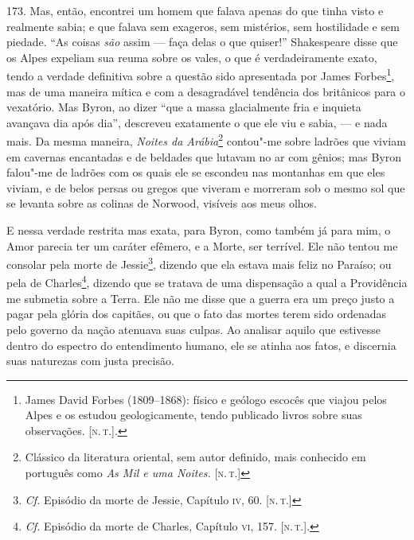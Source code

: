 173. Mas, então, encontrei um homem que falava apenas do que tinha visto
e realmente sabia; e que falava sem exageros, sem mistérios, sem
hostilidade e sem piedade. ``As coisas \emph{são} assim --- faça delas o
que quiser!'' Shakespeare disse que os Alpes expeliam sua reuma sobre os
vales, o que é verdadeiramente exato, tendo a verdade definitiva sobre a
questão sido apresentada por James Forbes\footnote{James David Forbes
  (1809--1868): físico e geólogo escocês que viajou pelos Alpes e os
  estudou geologicamente, tendo publicado livros sobre suas observações.
  {[}\textsc{n.\,t.}{]}.}, mas de uma maneira mítica e com a desagradável
tendência dos britânicos para o vexatório. Mas Byron, ao dizer ``que a
massa glacialmente fria e inquieta avançava dia após dia'', descreveu
exatamente o que ele viu e sabia, --- e nada mais. Da mesma maneira,
\emph{Noites da Arábia}\footnote{Clássico da literatura oriental, sem
  autor definido, mais conhecido em português como \emph{As Mil e uma
  Noites.} {[}\textsc{n.\,t.}{]}} contou"-me sobre ladrões que viviam em
cavernas encantadas e de beldades que lutavam no ar com gênios; mas
Byron falou"-me de ladrões com os quais ele se escondeu nas montanhas em
que eles viviam, e de belos persas ou gregos que viveram e morreram sob
o mesmo sol que se levanta sobre as colinas de Norwood, visíveis aos
meus olhos.

E nessa verdade restrita mas exata, para Byron, como também já para mim,
o Amor parecia ter um caráter efêmero, e a Morte, ser terrível. Ele não
tentou me consolar pela morte de Jessie\footnote{\emph{Cf.} Episódio da
  morte de Jessie, Capítulo \textsc{iv}, 60. {[}\textsc{n.\,t.}{]}}, dizendo que ela
estava mais feliz no Paraíso; ou pela de Charles\footnote{\emph{Cf.}
  Episódio da morte de Charles, Capítulo \textsc{vi}, 157. {[}\textsc{n.\,t.}{]}.},
dizendo que se tratava de uma dispensação a qual a Providência me
submetia sobre a Terra. Ele não me disse que a guerra era um preço justo
a pagar pela glória dos capitães, ou que o fato das mortes terem sido
ordenadas pelo governo da nação atenuava suas culpas. Ao analisar aquilo
que estivesse dentro do espectro do entendimento humano, ele se atinha
aos fatos, e discernia suas naturezas com justa precisão.


